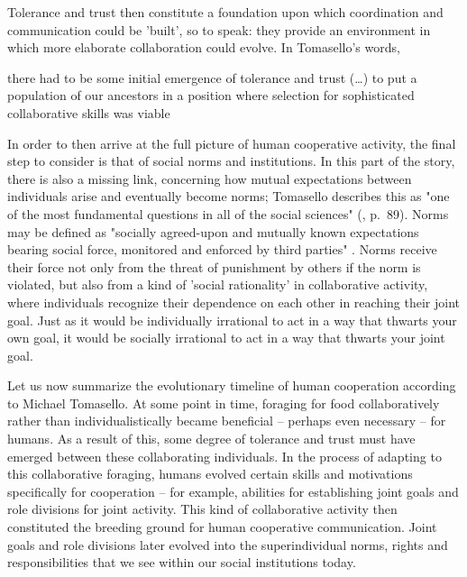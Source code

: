Tolerance and trust then constitute a foundation upon which coordination and communication could be 'built', so to speak: they provide an environment in which more elaborate collaboration could evolve. In Tomasello's words,
\begin{quoting}
    there had to be some initial emergence of tolerance and trust (\ldots) to put a population of our ancestors in a position where selection for sophisticated collaborative skills was viable
\end{quoting}

In order to then arrive at the full picture of human cooperative activity, the final step to consider is that of social norms and institutions.
In this part of the story, there is also a missing link, concerning how mutual expectations between individuals arise and eventually become norms; Tomasello describes this as "one of the most fundamental questions in all of the social sciences" (\citeyear{Tomasello09}, p.~89).
Norms may be defined as "socially agreed-upon and mutually known expectations bearing social force, monitored and enforced by third parties" \citep[p.~87]{Tomasello09}. Norms receive their force not only from the threat of punishment by others if the norm is violated, but also from a kind of 'social rationality' in collaborative activity, where individuals recognize their dependence on each other in reaching their joint goal. Just as it would be individually irrational to act in a way that thwarts your own goal, it would be socially irrational to act in a way that thwarts your joint goal.

Let us now summarize the evolutionary timeline of human cooperation according to Michael Tomasello.
At some point in time, foraging for food collaboratively rather than individualistically became beneficial -- perhaps even necessary -- for humans.
As a result of this, some degree of tolerance and trust must have emerged between these collaborating individuals.
In the process of adapting to this collaborative foraging, humans evolved certain skills and motivations specifically for cooperation -- for example, abilities for establishing joint goals and role divisions for joint activity.
This kind of collaborative activity then constituted the breeding ground for human cooperative communication.
Joint goals and role divisions later evolved into the superindividual norms, rights and responsibilities that we see within our social institutions today.

